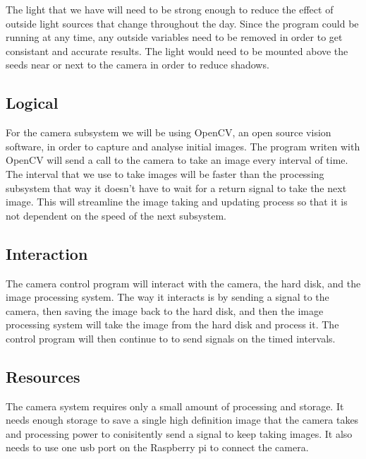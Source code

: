 The light that we have will need to be strong enough to reduce the effect of outside light sources that change throughout the day. Since the program could be running at any time, any outside variables need to be removed in order to get consistant and accurate results. The light would need to be mounted above the seeds near or next to the camera in order to reduce shadows. 

\subsection{Logical}
For the camera subsystem we will be using OpenCV, an open source vision software, in order to capture and analyse initial images. The program writen with OpenCV will send a call to the camera to take an image every interval of time. The interval that we use to take images will be faster than the processing subsystem that way it doesn't have to wait for a return signal to take the next image. This will streamline the image taking and updating process so that it is not dependent on the speed of the next subsystem.

\subsection{Interaction}
The camera control program will interact with the camera, the hard disk, and the image processing system. The way it interacts is by sending a signal to the camera, then saving the image back to the hard disk, and then the image processing system will take the image from the hard disk and process it. The control program will then continue to to send signals on the timed intervals.

\subsection{Resources}
The camera system requires only a small amount of processing and storage. It needs enough storage to save a single high definition image that the camera takes and processing power to conisitently send a signal to keep taking images. It also needs to use one usb port on the Raspberry pi to connect the camera.

